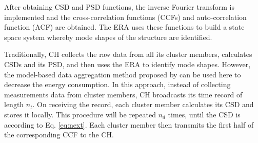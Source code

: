 After obtaining CSD and PSD functions, the inverse Fourier transform is implemented and the cross-correlation functions (CCFs) and auto-correlation function (ACF) are obtained.  The ERA uses these functions to build a state space system whereby mode shapes of the structure are identified.

Traditionally, CH collects the raw data from all its cluster members, calculates CSDs and its PSD, and then uses the ERA to identify mode shapes.  However, the model-based data aggregation method proposed by \cite{nagayama2008structural} can be used here to decrease the energy consumption. In this approach, instead of collecting measurements data from cluster members, CH broadcasts its time record of length \(n_t\). On receiving the record, each cluster member calculates its CSD and stores it locally.  This procedure will be repeated \(n_d\) times, until the CSD is according to Eq. \ref{eq:next}. Each cluster member then transmits the first half of the corresponding CCF to the CH.
\begin{comment}
\begin{figure}
	\centering
		\figurecurrentwidth{clusteraggregation}
	\caption{Model-based data aggregation (Assume 50 \% Overlap)}
	\label{fig:clusteraggregation}
\end{figure}
\end{comment}

